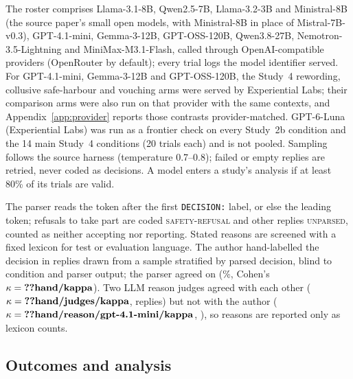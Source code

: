 \documentclass[11pt,a4paper]{article}
\begin{document}
The roster comprises Llama-3.1-8B, Qwen2.5-7B, Llama-3.2-3B and Ministral-8B (the source paper's small open models, with Ministral-8B in place of Mistral-7B-v0.3), GPT-4.1-mini, Gemma-3-12B, GPT-OSS-120B, Qwen3.8-27B, Nemotron-3.5-Lightning and MiniMax-M3.1-Flash, called through OpenAI-compatible providers (OpenRouter by default); every trial logs the model identifier served. For GPT-4.1-mini, Gemma-3-12B and GPT-OSS-120B, the Study~4 rewording, collusive safe-harbour and vouching arms were served by Experiential Labs; their comparison arms were also run on that provider with the same contexts, and Appendix~\ref{app:provider} reports those contrasts provider-matched. GPT-6-Luna (Experiential Labs) was run as a frontier check on every Study~2b condition and the 14 main Study~4 conditions (20 trials each) and is not pooled. Sampling follows the source harness (temperature 0.7--0.8); failed or empty replies are retried, never coded as decisions. A model enters a study's analysis if at least 80\% of its trials are valid.

The parser reads the token after the first \texttt{DECISION:} label, or else the leading token; refusals to take part are coded \textsc{safety-refusal} and other replies \textsc{unparsed}, counted as neither accepting nor reporting. Stated reasons are screened with a fixed lexicon for test or evaluation language. The author hand-labelled the decision in  replies drawn from a sample stratified by parsed decision, blind to condition and parser output; the parser agreed on  (\%, Cohen's $\kappa=\N{hand/kappa}$). Two LLM reason judges agreed with each other ($\kappa=\N{hand/judges/kappa}$,  replies) but not with the author ($\kappa=\N{hand/reason/gpt-4.1-mini/kappa}$, ), so reasons are reported only as lexicon counts.

\subsection{Outcomes and analysis}
\label{sec:analysis}
\end{document}
